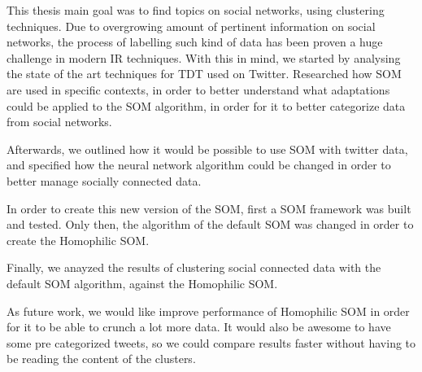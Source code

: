 \label{ch:conclusions}
This thesis main goal was to find topics on social networks, using clustering techniques. Due to overgrowing amount of pertinent information on social networks, the process of labelling such kind of data has been proven a huge challenge in modern \ac{IR} techniques. 
With this in mind, we started by analysing the state of the art techniques for \ac{TDT} used on Twitter. Researched how \ac{SOM} are used in specific contexts, in order to better understand what adaptations could be applied to the \ac{SOM} algorithm, in order for it to better categorize data from social networks.

Afterwards, we outlined how it would be possible to use \ac{SOM} with twitter data, and specified how the neural network algorithm could be changed in order to better manage socially connected data. 

In order to create this new version of the \ac{SOM}, first a \ac{SOM} framework was built and tested. Only then, the algorithm of the default \ac{SOM} was changed in order to create the Homophilic SOM.

Finally, we anayzed the results of clustering social connected data with the default \ac{SOM} algorithm, against the Homophilic SOM.

As future work, we would like improve performance of Homophilic \ac{SOM} in order for it to be able to crunch a lot more data. It would also be awesome to have some pre categorized tweets, so we could compare results faster without having to be reading the content of the clusters.

\cleardoublepage
 
